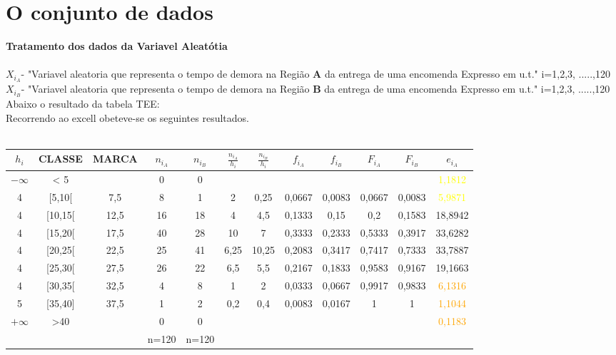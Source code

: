 \section{O conjunto de dados}\label{dados}
\noindent
\textbf{Tratamento dos dados da Variavel Aleatótia} \\
\\
$X_{i_A}$- "Variavel aleatoria que representa o tempo de demora na Região \textbf{A} da entrega de uma encomenda Expresso em u.t." \quad i=1,2,3, .....,120 \\
$X_{i_B}$- "Variavel aleatoria que representa o tempo de demora na Região \textbf{B} da entrega de uma encomenda Expresso em u.t." \quad i=1,2,3, .....,120 \\
Abaixo o resultado da tabela TEE:\\
Recorrendo ao excell obeteve-se os seguintes resultados. \\
\\
\begin{minipage}{0pt}
\begin{tabular}{ |c|c|c|c|c|c|c|c|c|c|c|c| }
\hline
\rowcolor[gray]{0.7}
$h_i$ & CLASSE & MARCA & $n_{i_A}$ & $n_{i_B}$ & $\frac{n_{i_A}}{h_i}$ & $\frac{n_{i_B}}{h_i}$ & $f_{i_A}$	& $f_{i_B}$ & $F_{i_A}$ & $F_{i_B}$ & $e_{i_A}$ \\
\hline
$-\infty$ & < 5 & & 0 & 0 & & & & & & & \textcolor{yellow}{1,1812} \\
\hline
4 & [5,10[ & 7,5 & 8 & 1 & 2 & 0,25 & 0,0667 & 0,0083 & 0,0667 & 0,0083 & \textcolor{yellow}{5,9871}\\
\hline
4 & [10,15[ & 12,5 & 16 & 18 & 4 & 4,5 & 0,1333 & 0,15 & 0,2 & 0,1583 & 18,8942\\
\hline
4 & [15,20[ & 17,5 & 40 & 28 & 10 & 7 & 0,3333 & 0,2333 & 0,5333 & 0,3917 & 33,6282\\
\hline
4 & [20,25[ & 22,5 & 25 & 41 & 6,25 & 10,25 & 0,2083 & 0,3417 & 0,7417 & 0,7333 & 33,7887\\
\hline
4 & [25,30[ & 27,5 & 26 & 22 & 6,5 & 5,5 & 0,2167 & 0,1833 & 0,9583 & 0,9167 & 19,1663\\
\hline
4 & [30,35[ & 32,5 & 4 & 8 & 1 & 2 & 0,0333 & 0,0667 & 0,9917 & 0,9833 & \textcolor{orange}{6,1316}\\
\hline
5 & [35,40] & 37,5 & 1 & 2 & 0,2 & 0,4 & 0,0083 & 0,0167 & 1 & 1 & \textcolor{orange}{1,1044}\\
\hline
$+\infty$ & >40 & & 0 & 0 & & & & & & & \textcolor{orange}{0,1183}\\
\hline
& & & n=120 & n=120 & & & & & & & \\
\hline
\end{tabular}
\end{minipage}
